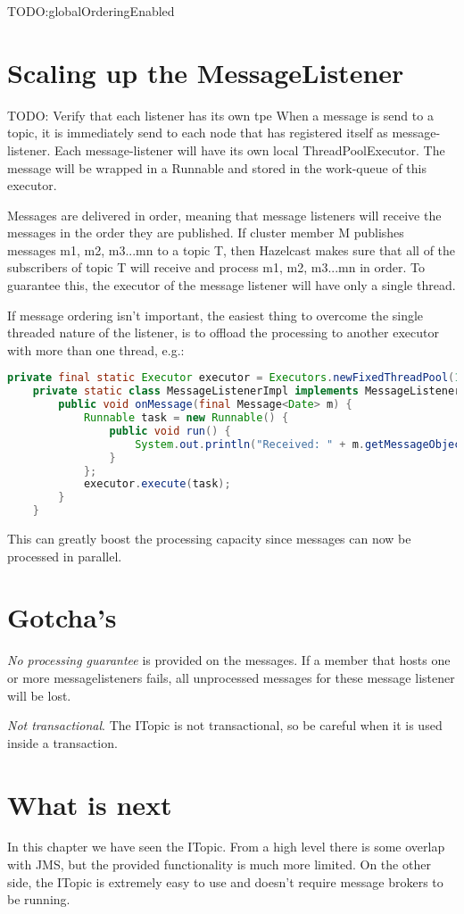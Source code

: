 TODO:globalOrderingEnabled

\section{Scaling up the MessageListener}
TODO: Verify that each listener has its own tpe
When a message is send to a topic, it is immediately send to each node that has registered itself as message-listener. Each message-listener will have its own local ThreadPoolExecutor. The message will be wrapped in a Runnable and stored in the work-queue of this executor.

Messages are delivered in order, meaning that message listeners will receive the messages in the order they are published. If cluster member M publishes messages m1, m2, m3...mn to a topic T, then Hazelcast makes sure that all of the subscribers of topic T will receive and process m1, m2, m3...mn in order. To guarantee this, the executor of the message listener will have only a single thread.

If message ordering isn't important, the easiest thing to overcome the single threaded nature of the listener, is to offload the processing to another executor with more than one thread, e.g.:
\begin{lstlisting}[language=java]
    private final static Executor executor = Executors.newFixedThreadPool(10);       
    private static class MessageListenerImpl implements MessageListener<Date> {
        public void onMessage(final Message<Date> m) {
            Runnable task = new Runnable() {
                public void run() {
                    System.out.println("Received: " + m.getMessageObject());
                }
            };
            executor.execute(task);
        }
    } 
\end{lstlisting}
This can greatly boost the processing capacity since messages can now be processed in parallel.

\section{Gotcha's}

\emph{No processing guarantee} is provided on the messages. If a member that hosts one or more messagelisteners fails, all unprocessed messages for these message listener will be lost.

\emph{Not transactional}. The ITopic is not transactional, so be careful when it is used inside a transaction.

\section{What is next}
In this chapter we have seen the ITopic. From a high level there is some overlap with JMS, but the provided functionality is much more limited. On the other side, the ITopic is extremely easy to use and doesn't require message brokers to be running.
